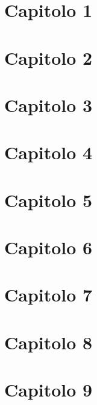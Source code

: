 \section{Capitolo 1}


\section{Capitolo 2}


\section{Capitolo 3}


\section{Capitolo 4}


\section{Capitolo 5}


\section{Capitolo 6}


\section{Capitolo 7}


\section{Capitolo 8}


\section{Capitolo 9}

